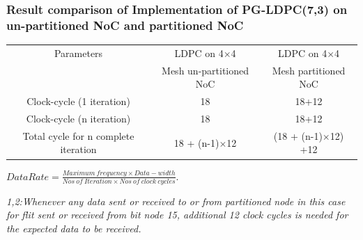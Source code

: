 \begin{frame}
\frametitle{Result comparison of Implementation of PG-LDPC(7,3) on un-partitioned NoC and partitioned NoC}
\begin{table} [scale=0.6]
\begin{center}
\resizebox{\textwidth}{!}
{\begin{tabular}{||c || c| c ||} \hline
Parameters 			      	& LDPC on 4$\times$4      	& LDPC on 4$\times$4 	\\ [0.5ex]
					& Mesh un-partitioned NoC 	& Mesh partitioned NoC  \\ \hline
Clock-cycle (1 iteration) 	      	& 18 				& 18+12\footnotemark	\\ \hline
Clock-cycle (n iteration) 	      	& 18 				& 18+12\footnotemark 	\\ \hline
Total cycle for n complete iteration 	& 18 + (n-1)$\times$12 		& (18 + (n-1)$\times$12) +12 \\ \hline
\end{tabular}}
\end{center}
\end{table}
\begin{center}
$Data Rate = \frac {Maximum\ frequency \times Data-width }{Nos\ of\ Iteration \times Nos\ of\ clock\ cycles} $.\\
\end {center}
\tiny
\textit{1,2:Whenever any data sent or received to or from partitioned node in this case for flit sent or received from bit node 15, additional 12 clock cycles is needed for the expected data to be received.}
\end{frame}

